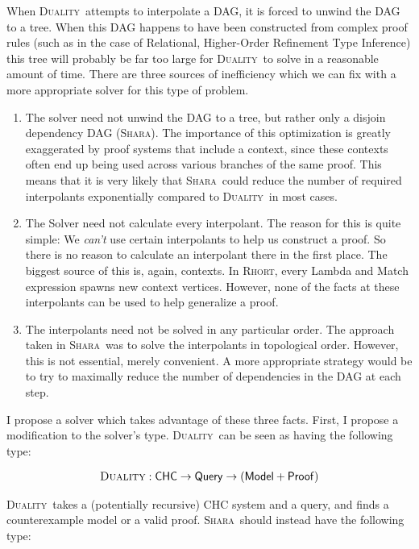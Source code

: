 \documentclass{article}
\newcommand{\DUALITY}{\textsc{Duality}}
\newcommand{\SHARA}{\textsc{Shara}}
\newcommand{\RHORT}{\textsc{Rhort}}
\begin{document}
When \DUALITY~attempts to interpolate a DAG, it is forced to unwind the DAG to a
tree.
%
When this DAG happens to have been constructed from complex proof rules (such
as in the case of Relational, Higher-Order Refinement Type Inference) this tree
will probably be far too large for \DUALITY~to solve in a reasonable amount of
time.
%
There are three sources of inefficiency which we can fix with a more
appropriate solver for this type of problem.

\begin{enumerate}
\item The solver need not unwind the DAG to a tree, but rather only a disjoin
dependency DAG (\SHARA). The importance of this optimization is greatly
exaggerated by proof systems that include a context, since these contexts often
end up being used across various branches of the same proof.
%
This means that it is very likely that \SHARA~could reduce the number of
required interpolants exponentially compared to \DUALITY~in most cases.
%
\item The Solver need not calculate every interpolant. The reason for this is
quite simple: We \emph{can't} use certain interpolants to help us construct a
proof. So there is no reason to calculate an interpolant there in the first
place. The biggest source of this is, again, contexts. In \RHORT, every Lambda
and Match expression spawns new context vertices. However, none of the facts at
these interpolants can be used to help generalize a proof.
%
\item The interpolants need not be solved in any particular order. The approach
taken in \SHARA~was to solve the interpolants in topological order. However,
this is not essential, merely convenient. A more appropriate strategy would be
to try to maximally reduce the number of dependencies in the DAG at each step.

\end{enumerate}

I propose a solver which takes advantage of these three facts. First, I propose
a modification to the solver's type. \DUALITY~can be seen as having the following type:

\begin{align*}
\DUALITY : \mathsf{CHC} \rightarrow \mathsf{Query} \rightarrow (\mathsf{Model} + \mathsf{Proof})
\end{align*}

\DUALITY~takes a (potentially recursive) CHC system and a query, and finds a
counterexample model or a valid proof. \SHARA~should instead have the following type:
\end{document}
